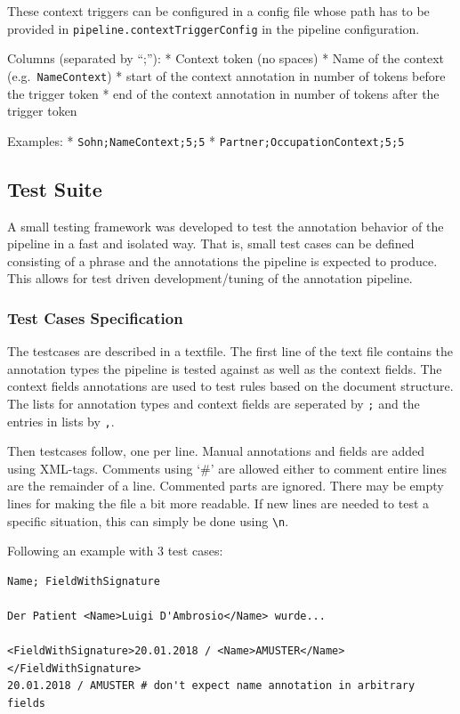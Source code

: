 These context triggers can be configured in a config file whose path has
to be provided in \texttt{pipeline.contextTriggerConfig} in the pipeline
configuration.

Columns (separated by ``;''): * Context token (no spaces) * Name of the
context (e.g.~\texttt{NameContext}) * start of the context annotation in
number of tokens before the trigger token * end of the context
annotation in number of tokens after the trigger token

Examples: * \texttt{Sohn;NameContext;5;5} *
\texttt{Partner;OccupationContext;5;5}

\subsection{Test Suite}\label{test-suite}

A small testing framework was developed to test the annotation behavior
of the pipeline in a fast and isolated way. That is, small test cases
can be defined consisting of a phrase and the annotations the pipeline
is expected to produce. This allows for test driven development/tuning
of the annotation pipeline.

\subsubsection{Test Cases Specification}\label{test-cases-specification}

The testcases are described in a textfile. The first line of the text
file contains the annotation types the pipeline is tested against as
well as the context fields. The context fields annotations are used to
test rules based on the document structure. The lists for annotation
types and context fields are seperated by \texttt{;} and the entries in
lists by \texttt{,}.

Then testcases follow, one per line. Manual annotations and fields are
added using XML-tags. Comments using `\#' are allowed either to comment
entire lines are the remainder of a line. Commented parts are ignored.
There may be empty lines for making the file a bit more readable. If new
lines are needed to test a specific situation, this can simply be done
using \texttt{\textbackslash{}n}.

Following an example with 3 test cases:

\begin{verbatim}
Name; FieldWithSignature

Der Patient <Name>Luigi D'Ambrosio</Name> wurde...

<FieldWithSignature>20.01.2018 / <Name>AMUSTER</Name> </FieldWithSignature>
20.01.2018 / AMUSTER # don't expect name annotation in arbitrary fields
\end{verbatim}

